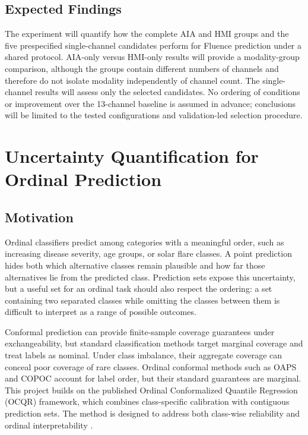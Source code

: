 \documentclass[12pt]{report}
\begin{document}
\section{Expected Findings}

The experiment will quantify how the complete AIA and HMI groups and the five prespecified single-channel candidates perform for Fluence prediction under a shared protocol. AIA-only versus HMI-only results will provide a modality-group comparison, although the groups contain different numbers of channels and therefore do not isolate modality independently of channel count. The single-channel results will assess only the selected candidates. No ordering of conditions or improvement over the 13-channel baseline is assumed in advance; conclusions will be limited to the tested configurations and validation-led selection procedure.

\chapter{Uncertainty Quantification for Ordinal Prediction}
\label{chap:project3}

\section{Motivation}

Ordinal classifiers predict among categories with a meaningful order, such as increasing disease severity, age groups, or solar flare classes. A point prediction hides both which alternative classes remain plausible and how far those alternatives lie from the predicted class. Prediction sets expose this uncertainty, but a useful set for an ordinal task should also respect the ordering: a set containing two separated classes while omitting the classes between them is difficult to interpret as a range of possible outcomes.

Conformal prediction can provide finite-sample coverage guarantees under exchangeability, but standard classification methods target marginal coverage and treat labels as nominal. Under class imbalance, their aggregate coverage can conceal poor coverage of rare classes. Ordinal conformal methods such as OAPS and COPOC account for label order, but their standard guarantees are marginal. This project builds on the published Ordinal Conformalized Quantile Regression (OCQR) framework, which combines class-specific calibration with contiguous prediction sets. The method is designed to address both class-wise reliability and ordinal interpretability \citep{hong2026ocqr}.
\end{document}

